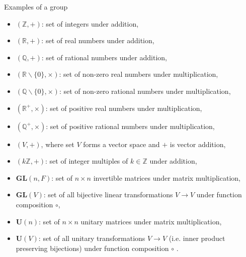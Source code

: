 \documentclass{beamer}
\begin{document}
\begin{frame}{Examples of a group}
    \begin{itemize}
        \item $(\mathbb{Z},+)$: set of integers under addition,
        \item $(\mathbb{R},+)$: set of real numbers under addition,
        \item $(\mathbb{Q},+)$: set of rational numbers under addition,
        \item $(\mathbb{R}\backslash \{0\},\times)$: set of non-zero real numbers under multiplication,
        \item $(\mathbb{Q}\backslash \{0\},\times)$: set of non-zero rational numbers under multiplication,
        \item $(\mathbb{R}^+,\times)$: set of positive real numbers under multiplication,
        \item $(\mathbb{Q}^+,\times)$: set of positive rational numbers under multiplication,
        \item $(V,+)$, where set $V$ forms a vector space and $+$ is vector addition, 
        \item $(k\mathbb{Z,+})$: set of integer multiples of $k\in\mathbb{Z}$ under addition,
        \item $\mathbf{GL}(n,F)$: set of $n\times n$ invertible matrices under matrix multiplication,
        \item $\mathbf{GL}(V)$: set of all bijective linear transformations $V\xrightarrow{}V$ under function composition $\circ$,
        \item $\mathbf{U}(n)$: set of $n\times n$ unitary matrices under matrix multiplication,
        \item $\mathbf{U}(V)$: set of all unitary transformations $V\xrightarrow{}V$ (i.e. inner product preserving bijections) under function composition $\circ$ .
    \end{itemize}
\end{frame}
\end{document}
